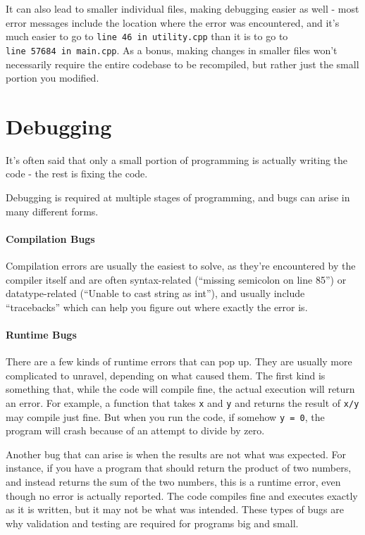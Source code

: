 It can also lead to smaller individual files, making debugging easier as
well - most error messages include the location where the error was
encountered, and it's much easier to go to
\texttt{line\ 46\ in\ utility.cpp} than it is to go to
\texttt{line\ 57684\ in\ main.cpp}. As a bonus, making changes in
smaller files won't necessarily require the entire codebase to be
recompiled, but rather just the small portion you modified.

\section{Debugging}
It's often said that only a small portion of programming is actually
writing the code - the rest is fixing the code.

Debugging is required at multiple stages of programming, and bugs can
arise in many different forms.

\hypertarget{compilation-bugs}{%
\paragraph{Compilation Bugs}\label{compilation-bugs}}

Compilation errors are usually the easiest to solve, as they're
encountered by the compiler itself and are often syntax-related
(``missing semicolon on line 85'') or datatype-related (``Unable to cast
string as int''), and usually include ``tracebacks'' which can help you
figure out where exactly the error is.

\hypertarget{runtime-bugs}{%
\paragraph{Runtime Bugs}\label{runtime-bugs}}

There are a few kinds of runtime errors that can pop up. They are
usually more complicated to unravel, depending on what caused them. The
first kind is something that, while the code will compile fine, the
actual execution will return an error. For example, a function that
takes \texttt{x} and \texttt{y} and returns the result of \texttt{x/y}
may compile just fine. But when you run the code, if somehow
\texttt{y\ =\ 0}, the program will crash because of an attempt to divide
by zero.

Another bug that can arise is when the results are not what was
expected. For instance, if you have a program that should return the
product of two numbers, and instead returns the sum of the two numbers,
this is a runtime error, even though no error is actually reported. The
code compiles fine and executes exactly as it is written, but it may not
be what was intended. These types of bugs are why validation and testing
are required for programs big and small.

